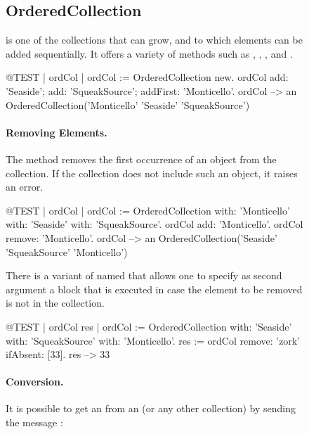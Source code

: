 \documentclass[a4paper,10pt,twoside]{book}
\begin{document}
\begin{figure}
\begin{center}
\subsection{OrderedCollection}
 is one of the collections that can grow, and to which elements can be added sequentially.
It offers a variety of methods such as , , , and . 

\begin{code}{@TEST | ordCol |}
ordCol := OrderedCollection new.
ordCol add: 'Seaside'; add: 'SqueakSource'; addFirst: 'Monticello'.
ordCol --> an OrderedCollection('Monticello' 'Seaside' 'SqueakSource')
\end{code}

\paragraph{Removing Elements.}
The method   removes the first occurrence of an object from the collection.
If the collection does not include such an object, it raises an error. 

\begin{code}{@TEST | ordCol | ordCol := OrderedCollection with: 'Monticello' with: 'Seaside' with: 'SqueakSource'.}
ordCol add: 'Monticello'.
ordCol remove: 'Monticello'.
ordCol --> an OrderedCollection('Seaside' 'SqueakSource' 'Monticello')
\end{code}

There is a variant of  named  that allows one to specify as second argument a block that is executed in case the element to be removed is not in the collection. 

\begin{code}{@TEST | ordCol res | ordCol := OrderedCollection with: 'Seaside' with: 'SqueakSource' with: 'Monticello'.}
res := ordCol remove: 'zork' ifAbsent: [33].
res --> 33
\end{code}

\paragraph{Conversion.}
It is possible to get an  from an  (or any other collection) by sending the message :


\end{center}
\end{figure}
\end{document}
